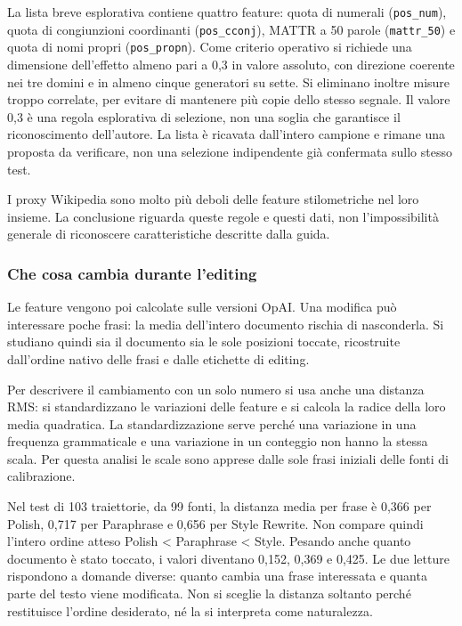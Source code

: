 La lista breve esplorativa contiene quattro feature: quota di numerali (\texttt{pos\_num}), quota di congiunzioni coordinanti (\texttt{pos\_cconj}), MATTR a 50 parole (\texttt{mattr\_50}) e quota di nomi propri (\texttt{pos\_propn}). Come criterio operativo si richiede una dimensione dell'effetto almeno pari a 0,3 in valore assoluto, con direzione coerente nei tre domini e in almeno cinque generatori su sette. Si eliminano inoltre misure troppo correlate, per evitare di mantenere più copie dello stesso segnale. Il valore 0,3 è una regola esplorativa di selezione, non una soglia che garantisce il riconoscimento dell'autore. La lista è ricavata dall'intero campione e rimane una proposta da verificare, non una selezione indipendente già confermata sullo stesso test.

I proxy Wikipedia sono molto più deboli delle feature stilometriche nel loro insieme. La conclusione riguarda queste regole e questi dati, non l'impossibilità generale di riconoscere caratteristiche descritte dalla guida.

\subsubsection{Che cosa cambia durante l'editing}\label{che-cosa-cambia-durante-lediting}

Le feature vengono poi calcolate sulle versioni OpAI. Una modifica può interessare poche frasi: la media dell'intero documento rischia di nasconderla. Si studiano quindi sia il documento sia le sole posizioni toccate, ricostruite dall'ordine nativo delle frasi e dalle etichette di editing.

Per descrivere il cambiamento con un solo numero si usa anche una distanza RMS: si standardizzano le variazioni delle feature e si calcola la radice della loro media quadratica. La standardizzazione serve perché una variazione in una frequenza grammaticale e una variazione in un conteggio non hanno la stessa scala. Per questa analisi le scale sono apprese dalle sole frasi iniziali delle fonti di calibrazione.

Nel test di 103 traiettorie, da 99 fonti, la distanza media per frase è 0,366 per Polish, 0,717 per Paraphrase e 0,656 per Style Rewrite. Non compare quindi l'intero ordine atteso Polish \textless{} Paraphrase \textless{} Style. Pesando anche quanto documento è stato toccato, i valori diventano 0,152, 0,369 e 0,425. Le due letture rispondono a domande diverse: quanto cambia una frase interessata e quanta parte del testo viene modificata. Non si sceglie la distanza soltanto perché restituisce l'ordine desiderato, né la si interpreta come naturalezza.


